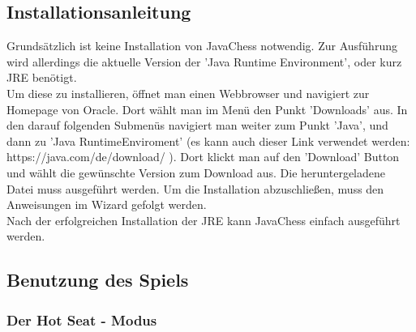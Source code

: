 \documentclass[12pt,a4paper]{article}
\begin{document}
 \subsection{Installationsanleitung}
	Grundsätzlich ist keine Installation von JavaChess notwendig. Zur Ausführung wird allerdings die aktuelle Version der 'Java Runtime Environment', oder kurz JRE benötigt.\\
Um diese zu installieren, öffnet man einen Webbrowser und navigiert zur Homepage von Oracle. Dort wählt man im Menü den Punkt 'Downloads' aus. In den darauf folgenden Submenüs navigiert man weiter zum Punkt 'Java', und dann zu 'Java RuntimeEnviroment' (es kann auch dieser Link verwendet werden: https://java.com/de/download/ ).  Dort klickt man auf den 'Download' Button und wählt die gewünschte Version zum Download aus. 
Die heruntergeladene Datei muss ausgeführt werden. Um die Installation abzuschließen, muss den Anweisungen im Wizard gefolgt werden. \\
Nach der erfolgreichen Installation der JRE kann JavaChess einfach ausgeführt werden.

 \subsection{Benutzung des Spiels}
	
	\subsubsection{Der Hot Seat - Modus}
	\label{SUBSUBSEC:USERDOCHOTSEAT}
	
\end{document}
